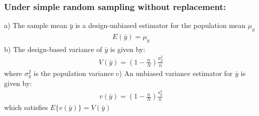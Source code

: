 \documentclass[a4paper,twoside,11pt]{article}
\begin{document}
{\subsubsection{Under simple random sampling without replacement:}
a) The sample mean $\bar y$ is a design-unbiased estimator for the population mean $\mu_y$
\begin{equation*}
\begin{aligned}
E(\bar{y}) = \mu_y
\end{aligned}
\end{equation*}
b) The design-based variance of $\bar{y}$ is given by:
\begin{equation*}
\begin{aligned}
V(\bar{y}) = (1-\frac{n}{N}) \frac{\sigma_y^2}{n}
\end{aligned}
\end{equation*}
\indent where $\sigma_y^2$ is the population variance
\newline
c) An unbiased variance estimator for $\bar{y}$ is given by:
\begin{equation*}
\begin{aligned}
v(\bar{y}) = (1-\frac{n}{N}) \frac{s_y^2}{n}
\end{aligned}
\end{equation*}
\indent which satisfies $E\{ v(\bar{y}) \} = V(\bar{y})$}
\end{document}
